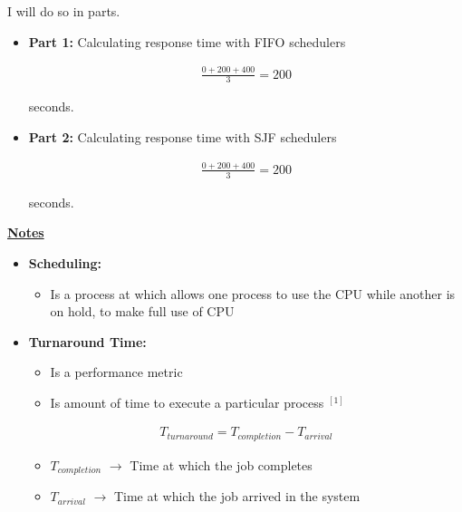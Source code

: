 \documentclass[12pt]{article}
\begin{document}
\begin{enumerate}[1.]
    \bigskip

    I will do so in parts.

    \begin{itemize}
        \item \textbf{Part 1:} Calculating response time with FIFO schedulers

        \begin{align}
            \frac{0 + 200 + 400}{3} = 200
        \end{align}

        seconds.

        \item \textbf{Part 2:} Calculating response time with SJF schedulers

        \begin{align}
            \frac{0 + 200 + 400}{3} = 200
        \end{align}

        seconds.
    \end{itemize}

    \underline{\textbf{Notes}}

    \begin{itemize}
        \item \textbf{Scheduling:}

        \begin{itemize}
            \item Is a process at which allows one process to use the CPU while
            another is on hold, to make full use of CPU
        \end{itemize}

        \item \textbf{Turnaround Time:}
        \begin{itemize}
            \item Is a performance metric
            \item Is amount of time to execute a particular process $^{[1]}$
        \end{itemize}

        \bigskip

        \begin{align}
            T_{turnaround} = T_{completion} - T_{arrival}
        \end{align}

        \begin{itemize}
            \item $T_{completion}$ $\to$ Time at which the job completes
            \item $T_{arrival}$ $\to$ Time at which the job arrived in the system
        \end{itemize}


\end{itemize}
\end{enumerate}
\end{document}

